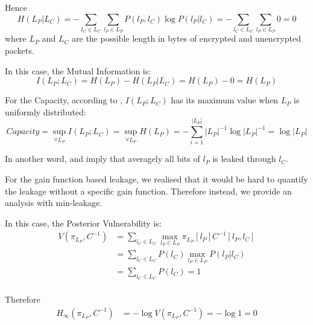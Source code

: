 Hence
\begin{equation}
	H(L_{P} | L_{C}) = - \sum_{l_{C} \in L_{C}} \sum_{l_{P} \in L_{P}}P(l_{P} , l_{C}) \log{P(l_{P} | l_{C})} = - \sum_{l_{C} \in L_{C}} \sum_{l_{P} \in L_{P}} 0 = 0
\end{equation}
where $L_{P}$ and $L_{C}$ are the possible length in bytes of encrypted and unencrypted packets.

In this case, the Mutual Information is:
\begin{equation} \label{Eq: MI in length}
	I(L_{P};L_{C}) = H(L_{P}) - H(L_{P} | L_{C} ) = H(L_{P}) - 0 = H(L_{P})
\end{equation}

For the Capacity, according to , $I(L_{P};L_{C})$ has its maximum value when $L_{P}$ is uniformly distributed:
\begin{equation} \label{Eq: Cap in length}
	Capacity = \sup_{\forall L_{P}}{I(L_{P};L_{C})} = \sup_{\forall L_{P}}H(L_{P}) = - \sum_{i = 1}^{|L_{P}|}|L_{P}|^{-1}\log{|L_{P}|^{-1}} = \log{|L_{P}|}
\end{equation}

In another word,  and   imply that averagely all bits of $l_{P}$ is leaked through $l_{C}$.

For the gain function based leakage\cite{GLeakage}, we realised that it would be hard to quantify the leakage without a specific gain function. Therefore instead, we provide an analysis with min-leakage.

In this case, the Posterior Vulnerability is:
\begin{equation}
	\begin{aligned}
		V(\pi_{L_P}, C^{-1}) 
		&= \sum_{l_{C} \in L_{C}} \max_{l_{P} \in L_{P}} \pi_{L_P}[l_P]C^{-1}[l_P,l_C] \\
		&=  \sum_{l_{C} \in L_{C}} P(l_C) \max_{l_{P} \in L_{P}} P(l_P | l_C) \\
	      &= \sum_{l_{C} \in L_{C}} P(l_C) = 1 \\
	\end{aligned}
\end{equation}

Therefore
\begin{equation}
	\begin{aligned}
		H_{\infty}(\pi_{L_{P}}, C^{-1})
		 &= - \log{V(\pi_{L_{P}}, C^{-1})} = - \log1= 0
	\end{aligned}
\end{equation}

